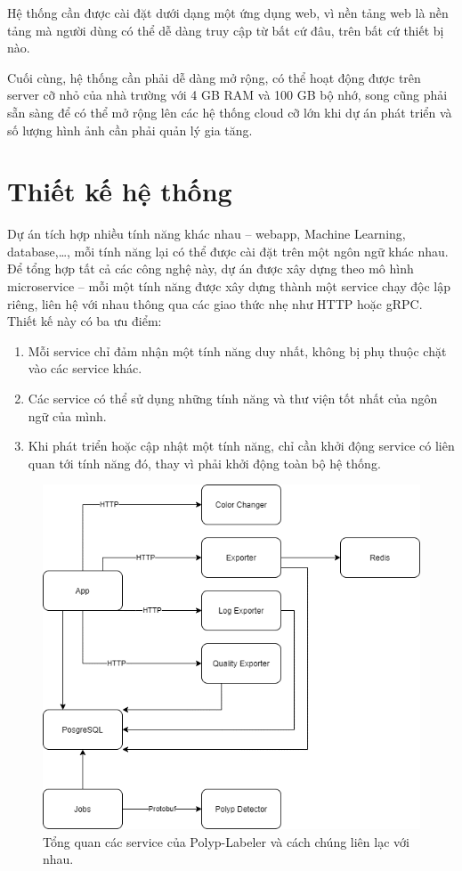 \documentclass[12pt]{extreport}
\begin{document}
Hệ thống cần được cài đặt dưới dạng một ứng dụng web, vì nền tảng web là nền tảng mà người dùng có thể dễ dàng truy cập từ bất cứ đâu, trên bất cứ thiết bị nào.

Cuối cùng, hệ thống cần phải dễ dàng mở rộng, có thể hoạt động được trên server cỡ nhỏ của nhà trường với 4 GB RAM và 100 GB bộ nhớ, song cũng phải sẵn sàng để có thể mở rộng lên các hệ thống cloud cỡ lớn khi dự án phát triển và số lượng hình ảnh cần phải quản lý gia tăng.

\section{Thiết kế hệ thống}

Dự án tích hợp nhiều tính năng khác nhau – webapp, Machine Learning, database,\dots , mỗi tính năng lại có thể được cài đặt trên một ngôn ngữ khác nhau. Để tổng hợp tất cả các công nghệ này, dự án được xây dựng theo mô hình microservice – mỗi một tính năng được xây dựng thành một service chạy độc lập riêng, liên hệ với nhau thông qua các giao thức nhẹ như HTTP hoặc gRPC. Thiết kế này có ba ưu điểm:
\begin{enumerate}
    \item Mỗi service chỉ đảm nhận một tính năng duy nhất, không bị phụ thuộc chặt vào các service khác.
    \item Các service có thể sử dụng những tính năng và thư viện tốt nhất của ngôn ngữ của mình.
    \item Khi phát triển hoặc cập nhật một tính năng, chỉ cần khởi động service có liên quan tới tính năng đó, thay vì phải khởi động toàn bộ hệ thống.
\end{enumerate}

\begin{figure}[h]
    \centering
    \includegraphics[width=0.85\linewidth]{figure41.png}
    \caption{Tổng quan các service của Polyp-Labeler và cách chúng liên lạc với nhau.}
\end{figure}
\end{document}
